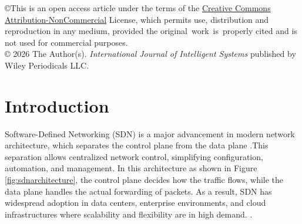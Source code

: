 \documentclass[ASNA,twocolumn]{USG} %
\begin{document}



\copyright{This is an open access article under the terms of the \href{Creative Commons Attribution-NonCommercial}{Creative Commons Attribution-NonCommercial} License, which permits use, distribution and reproduction in any medium, provided the
original~work~is~properly cited and is not used for commercial purposes.
\\[5pt]
  ©  2026 The Author(s). \textit{International Journal of Intelligent Systems} published by Wiley Periodicals LLC.}


\maketitle


\section{Introduction}\label{sec:introduction}
Software-Defined  Networking (SDN) is a major advancement in modern network architecture, which separates the control plane from the data plane \cite{singh2017survey}.This separation allows centralized network control, simplifying configuration, automation, and management. In this architecture as shown in Figure \ref{fig:sdnarchitecture}, the control plane decides how the traffic flows, while the data plane handles the actual forwarding of packets.  As a result, SDN has widespread adoption in data centers, enterprise environments, and cloud infrastructures where scalability and flexibility are in high demand. \cite{khorsandroo2021hybrid}.
\end{document}
